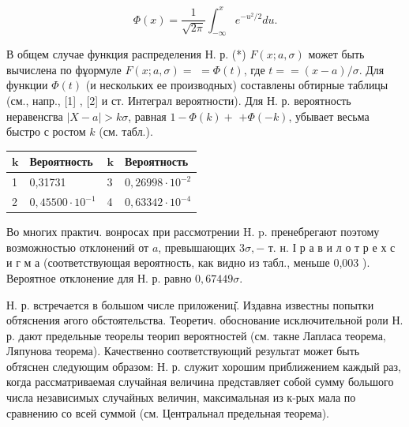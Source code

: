\documentclass[10pt]{article}
\begin{document}
\[

\Phi(x)=\frac{1}{\sqrt{2 \pi}} \int_{-\infty}^{x} e^{-u^{2} / 2} d u .

\]



В общем случае функция распределения Н. р. (*) $F(x ; a, \sigma)$ может быть вычислена по фұормуле $F(x ; a, \sigma)=$ $=\Phi(t)$, где $t==(x-a) / \sigma$. Для функции $\Phi(t)$ (и нескольких ее производных) составлены обтирные таблицы (см., напр., [1] , [2] и ст. Интеграл вероятности). Для Н. р. вероятность неравенсгва $|X-a|>k \sigma$, равная $1-\Phi(k)+$ $+\Phi(-k)$, убывает весьма быстро с ростом $k$ (см. табл.).



\begin{center}

\begin{tabular}{l|l||l|l}

\hline

$\boldsymbol{k}$ & Вероятность & $\boldsymbol{k}$ & Вероятность \\

\hline

1 & 0,31731 & 3 & $0,26998 \cdot 10^{-2}$ \\

2 & $0,45500 \cdot 10^{-1}$ & 4 & $0,63342 \cdot 10^{-4}$ \\

\hline

\end{tabular}

\end{center}



Во многих практич. вонросах при рассмотрении H. p. пренебрегают поэтому возможностью отклонений от $a$, превышающих $3 \sigma,-$ т. н. І р а в и л о т р е х с и г м а (соответствующая вероятность, как видно из табл., меньше 0,003 ). Вероятное отклонение для Н. р. равно $0,67449 \sigma$.



Н. р. встречается в большом числе приложениц̆. Издавна известны попытки обтяснения әгого обстоятельства. Теоретич. обоснование исключительной роли Н. р. дают предельные теорелы теорип вероятностей (см. такне Лапласа теорема, Ляпунова теорема). Качественно соответствующий результат может быть обтяснен следующим образом: Н. р. служит хорошим приближением каждый раз, когда рассматриваемая случайная величина представляет собой сумму большого числа независимых случайных величин, максимальная из к-рых мала по сравнению со всей суммой (см. Центральнал предельная теорема).
\end{document}
